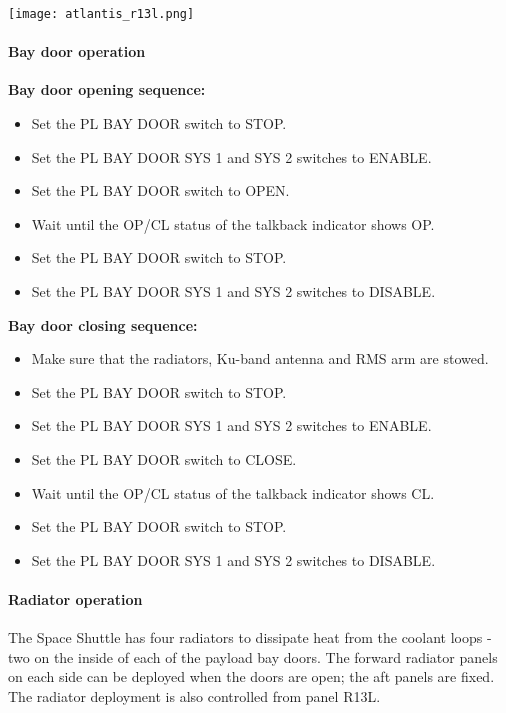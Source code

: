 \documentclass[Orbiter User Manual.tex]{subfiles}
\begin{document}
\begin{center}
\texttt{[image: atlantis\_r13l.png]}
\end{center}

\paragraph{Bay door operation}

\textbf{Bay door opening sequence:}
\begin{itemize}
\item Set the PL BAY DOOR switch to STOP.
\item Set the PL BAY DOOR SYS 1 and SYS 2 switches to ENABLE.
\item Set the PL BAY DOOR switch to OPEN.
\item Wait until the OP/CL status of the talkback indicator shows OP.
\item Set the PL BAY DOOR switch to STOP.
\item Set the PL BAY DOOR SYS 1 and SYS 2 switches to DISABLE.
\end{itemize}

\noindent
\textbf{Bay door closing sequence:}
\begin{itemize}
\item Make sure that the radiators, Ku-band antenna and RMS arm are stowed.
\item Set the PL BAY DOOR switch to STOP.
\item Set the PL BAY DOOR SYS 1 and SYS 2 switches to ENABLE.
\item Set the PL BAY DOOR switch to CLOSE.
\item Wait until the OP/CL status of the talkback indicator shows CL.
\item Set the PL BAY DOOR switch to STOP.
\item Set the PL BAY DOOR SYS 1 and SYS 2 switches to DISABLE.
\end{itemize}

\paragraph{Radiator operation}
The Space Shuttle has four radiators to dissipate heat from the coolant loops - two on the inside of each of the payload bay doors. The forward radiator panels on each side can be deployed when the doors are open; the aft panels are fixed. The radiator deployment is also controlled from panel R13L.\\
\end{document}
